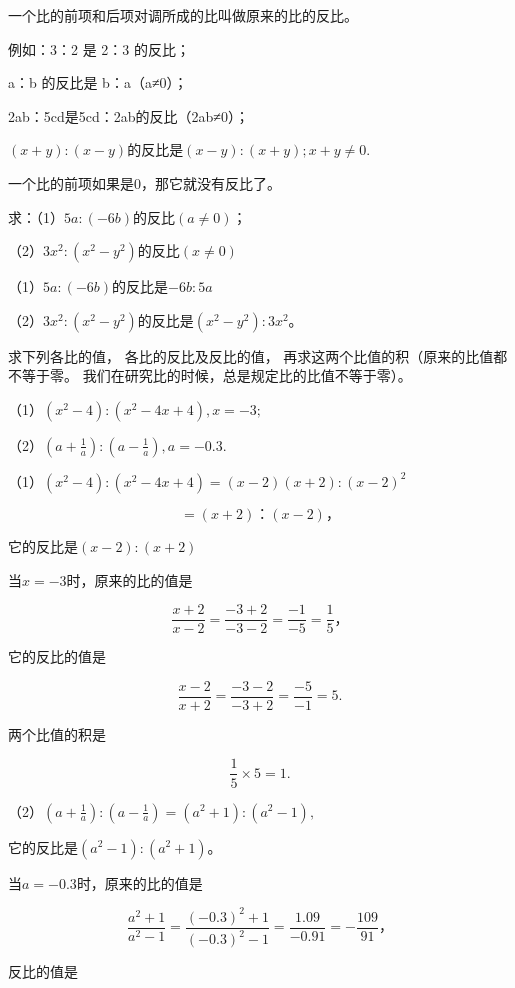 一个比的前项和后项对调所成的比叫做原来的比的反比。

例如：3：2 是 2：3 的反比；

a：b 的反比是 b：a（a≠0）；

2ab：5cd是5cd：2ab的反比（2ab≠0）；

\((x + y):(x - y)\)的反比是\((x - y):(x + y); x + y \neq 0.\)

 一个比的前项如果是0，那它就没有反比了。

 求：（1）\(5a:(-6b)\)的反比\((a \neq 0)\)；

（2）\(3x^{2}:(x^{2} - y^{2})\)的反比\((x\neq 0)\)

 （1）\(5a:(-6b)\)的反比是\(-6b:5a\)

（2）\(3x^{2}:(x^{2} - y^{2})\)的反比是\((x^{2} - y^{2}):3x^{2}\)。

 求下列各比的值， 各比的反比及反比的值，
再求这两个比值的积（原来的比值都不等于零。
我们在研究比的时候，总是规定比的比值不等于零）。

（1）\((x^{2} - 4):(x^{2} - 4x + 4), x = -3;\)

（2）\(\left(a + \frac{1}{a}\right):\left(a - \frac{1}{a}\right), a = -0.3.\)

（1）\((x^{2} - 4):(x^{2} - 4x + 4) = (x - 2)(x + 2):(x - 2)^{2}\)

\[
= (x + 2)\text{：} (x - 2)\text{，}
\]

它的反比是\((x - 2):(x + 2)\)

当\(x = -3\)时，原来的比的值是

\[
\frac{x + 2}{x - 2} = \frac{- 3 + 2}{- 3 - 2} = \frac{- 1}{- 5} = \frac{1}{5}\text{，}
\]

它的反比的值是

\[
\frac{x - 2}{x + 2} = \frac{- 3 - 2}{- 3 + 2} = \frac{- 5}{- 1} = 5.
\]

两个比值的积是

\[
\frac{1}{5} \times 5 = 1.
\]

（2）\(\left(a + \frac{1}{a}\right):\left(a - \frac{1}{a}\right) = (a^2 + 1):(a^2 - 1),\)

它的反比是\((a^2 - 1): (a^2 + 1)\)。

当\(a = -0.3\)时，原来的比的值是

\[
\frac{a ^{2} + 1}{a ^{2} - 1} = \frac{(- 0.3) ^{2} + 1}{(- 0.3) ^{2} - 1} = \frac{1.09}{- 0.91} = - \frac{109}{91}\text{，}
\]

反比的值是

